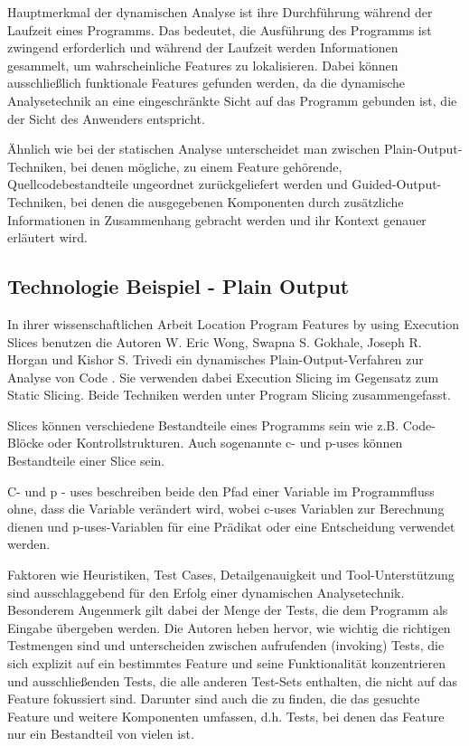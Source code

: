 \documentclass[runningheads,a4paper]{llncs}
\begin{document}
Hauptmerkmal der dynamischen Analyse ist ihre Durchführung während der Laufzeit eines Programms. Das bedeutet, die Ausführung des Programms ist zwingend erforderlich und während der Laufzeit werden Informationen gesammelt, um wahrscheinliche Features zu lokalisieren. Dabei können ausschließlich funktionale Features gefunden werden, da die dynamische Analysetechnik an eine eingeschränkte Sicht auf das Programm gebunden ist, die der Sicht des Anwenders entspricht. 

Ähnlich wie bei der statischen Analyse unterscheidet man zwischen Plain-Output-Techniken, bei denen mögliche, zu einem Feature gehörende, Quellcodebestandteile ungeordnet zurückgeliefert werden und Guided-Output-Techniken, bei denen die ausgegebenen Komponenten durch zusätzliche Informationen in Zusammenhang gebracht werden und ihr Kontext genauer erläutert wird. 

\subsection*{Technologie Beispiel - Plain Output}

In ihrer wissenschaftlichen Arbeit Location Program Features by using Execution Slices benutzen die Autoren W. Eric Wong, Swapna S. Gokhale, Joseph R. Horgan und Kishor S. Trivedi ein dynamisches Plain-Output-Verfahren zur Analyse von Code \cite{Executionslices}. Sie verwenden dabei Execution Slicing im Gegensatz zum Static Slicing. Beide Techniken werden unter Program Slicing zusammengefasst.

Slices können verschiedene Bestandteile eines Programms sein wie z.B. Code-Blöcke oder Kontrollstrukturen. Auch sogenannte c- und p-uses können Bestandteile einer Slice sein.

C- und p - uses beschreiben beide den Pfad einer Variable im Programmfluss ohne, dass die Variable verändert wird, wobei c-uses Variablen zur Berechnung dienen und p-uses-Variablen für eine Prädikat oder eine Entscheidung verwendet werden.

Faktoren wie Heuristiken, Test Cases, Detailgenauigkeit und Tool-Unterstützung sind ausschlaggebend für den Erfolg einer dynamischen Analysetechnik. Besonderem Augenmerk gilt dabei der Menge der Tests, die dem Programm als Eingabe übergeben werden. Die Autoren heben hervor, wie wichtig die richtigen Testmengen sind und unterscheiden zwischen aufrufenden (invoking) Tests, die sich explizit auf ein bestimmtes Feature und seine Funktionalität konzentrieren und ausschließenden Tests, die alle anderen Test-Sets enthalten, die nicht auf das Feature fokussiert sind. Darunter sind auch die zu finden, die das gesuchte Feature und weitere Komponenten umfassen, d.h. Tests, bei denen das Feature nur ein Bestandteil von vielen ist.
\end{document}
